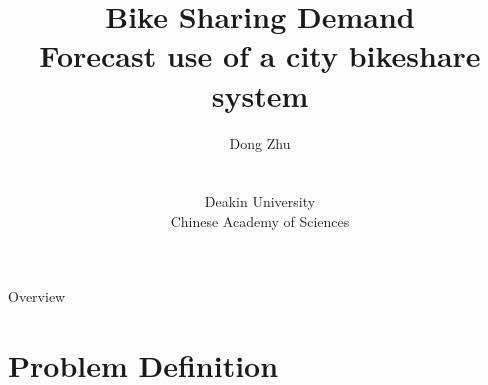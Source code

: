 \documentclass[
 size=14pt,
 paper=smartboard,  %
 mode=present, 		%
 display=slides, 	%
 style=tuliplab,  	%
 pauseslide,
 fleqn,leqno]{powerdot}
\title{Bike Sharing Demand
\\Forecast use of a city bikeshare system}
\author{
Dong Zhu
\\
\\ 
\\Deakin University
\\Chinese Academy of Sciences
}
\date{\gitCommitterDate}
\begin{document}
\maketitle



\begin{slide}[toc=,bm=]{Overview}
\tableofcontents[content=currentsection,type=1]
\end{slide}


\section{Problem Definition}
\end{document}
